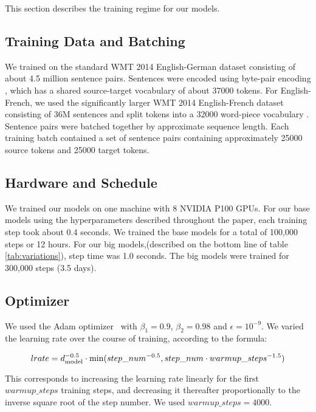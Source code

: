 This section describes the training regime for our models. 


\subsection{Training Data and Batching}
We trained on the standard WMT 2014 English-German dataset consisting of about 4.5 million sentence pairs.  Sentences were encoded using byte-pair encoding \citep{DBLP:journals/corr/BritzGLL17}, which has a shared source-target vocabulary of about 37000 tokens. For English-French, we used the significantly larger WMT 2014 English-French dataset consisting of 36M sentences and split tokens into a 32000 word-piece vocabulary \citep{wu2016google}.  Sentence pairs were batched together by approximate sequence length.  Each training batch contained a set of sentence pairs containing approximately 25000 source tokens and 25000 target tokens.  

\subsection{Hardware and Schedule}

We trained our models on one machine with 8 NVIDIA P100 GPUs.  For our base models using the hyperparameters described throughout the paper, each training step took about 0.4 seconds.  We trained the base models for a total of 100,000 steps or 12 hours.  For our big models,(described on the bottom line of table \ref{tab:variations}), step time was 1.0 seconds.  The big models were trained for 300,000 steps (3.5 days).

\subsection{Optimizer} We used the Adam optimizer~\citep{kingma2014adam} with $\beta_1=0.9$, $\beta_2=0.98$ and $\epsilon=10^{-9}$.  We varied the learning rate over the course of training, according to the formula:

\begin{equation}
lrate = d_{\text{model}}^{-0.5} \cdot
  \min({step\_num}^{-0.5},
    {step\_num} \cdot {warmup\_steps}^{-1.5})
\end{equation}

This corresponds to increasing the learning rate linearly for the first $warmup\_steps$ training steps, and decreasing it thereafter proportionally to the inverse square root of the step number.  We used $warmup\_steps=4000$.

